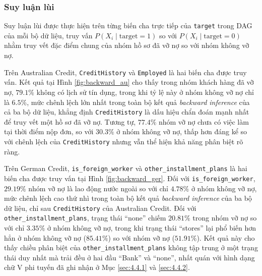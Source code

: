 \subsubsection{Suy luận lùi}
\noindent
Suy luận lùi được thực hiện trên từng biến cha trực tiếp của \texttt{target} trong DAG của mỗi bộ dữ liệu, truy vấn $P(X_i \mid \text{target}=1)$ so với $P(X_i \mid \text{target}=0)$ nhằm truy vết đặc điểm chung của nhóm hồ sơ đã vỡ nợ so với nhóm không vỡ nợ.

Trên Australian Credit, \texttt{CreditHistory} và \texttt{Employed} là hai biến cha được truy vấn. Kết quả tại Hình \ref{fig:backward_au} cho thấy trong nhóm khách hàng đã vỡ nợ, $79.1\%$ không có lịch sử tín dụng, trong khi tỷ lệ này ở nhóm không vỡ nợ chỉ là $6.5\%$, mức chênh lệch lớn nhất trong toàn bộ kết quả \textit{backward inference} của cả ba bộ dữ liệu, khẳng định \texttt{CreditHistory} là dấu hiệu chẩn đoán mạnh nhất để truy vết một hồ sơ đã vỡ nợ. Tương tự, $77.4\%$ nhóm vỡ nợ chưa có việc làm tại thời điểm nộp đơn, so với $30.3\%$ ở nhóm không vỡ nợ, thấp hơn đáng kể so với chênh lệch của \texttt{CreditHistory} nhưng vẫn thể hiện khả năng phân biệt rõ ràng.

Trên German Credit, \texttt{is\_foreign\_worker} và \texttt{other\_installment\_plans} là hai biến cha được truy vấn tại Hình \ref{fig:backward_ger}. Đối với \texttt{is\_foreign\_worker}, $29.19\%$ nhóm vỡ nợ là lao động nước ngoài so với chỉ $4.78\%$ ở nhóm không vỡ nợ, mức chênh lệch cao thứ nhì trong toàn bộ kết quả \textit{backward inference} của ba bộ dữ liệu, chỉ sau \texttt{CreditHistory} của Australian Credit. Đối với \texttt{other\_installment\_plans}, trạng thái ``none'' chiếm $20.81\%$ trong nhóm vỡ nợ so với chỉ $3.35\%$ ở nhóm không vỡ nợ, trong khi trạng thái ``stores'' lại phổ biến hơn hẳn ở nhóm không vỡ nợ ($85.41\%$) so với nhóm vỡ nợ ($51.91\%$). Kết quả này cho thấy chiều phân biệt của \texttt{other\_installment\_plans} không tập trung ở một trạng thái duy nhất mà trải đều ở hai đầu ``Bank'' và ``none'', nhất quán với hình dạng chữ V phi tuyến đã ghi nhận ở Mục \ref{sec:4.4.1} và \ref{sec:4.4.2}.


